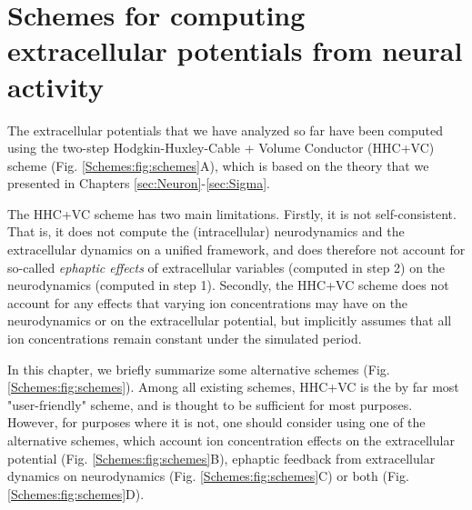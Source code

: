 \section{Schemes for computing extracellular potentials from neural activity}
\label{sec:Schemes}

The extracellular potentials that we have analyzed so far have been computed using the two-step Hodgkin-Huxley-Cable + Volume Conductor (HHC+VC) scheme (Fig. \ref{Schemes:fig:schemes}A), which is based on the theory that we presented in Chapters \ref{sec:Neuron}-\ref{sec:Sigma}. 

The HHC+VC scheme has two main limitations. Firstly, it is not self-consistent. That is, it does not compute the (intracellular) neurodynamics and the extracellular dynamics on a unified framework, and does therefore not account for so-called \textit{ephaptic effects} of extracellular variables (computed in step 2) on the neurodynamics (computed in step 1). Secondly, the HHC+VC scheme does not account for any effects that varying ion concentrations may have on the neurodynamics or on the extracellular potential, but implicitly assumes that all ion concentrations remain constant under the simulated period. 

In this chapter, we briefly summarize some alternative schemes (Fig. \ref{Schemes:fig:schemes}).
Among all existing schemes, HHC+VC is the by far most "user-friendly" scheme, and is thought to be sufficient for most purposes. However, for purposes where it is not, one should consider using one of the alternative schemes, which account ion concentration effects on the extracellular potential (Fig. \ref{Schemes:fig:schemes}B), ephaptic feedback from extracellular dynamics on neurodynamics (Fig. \ref{Schemes:fig:schemes}C) or both (Fig. \ref{Schemes:fig:schemes}D).


